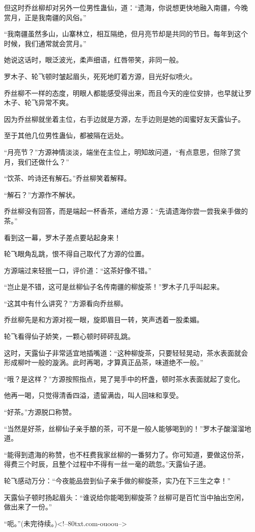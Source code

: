 \begin{this_body}
但这时乔丝柳却对另外一位男性蛊仙，道：“遗海，你说想更快地融入南疆，今晚赏月，正是我南疆的风俗。”

“我南疆虽然多山，山寨林立，相互隔绝，但月亮节却是共同的节日。每年到这个时候，我们通常就会赏月。”

她说这话时，眼泛波光，柔声细语，红唇带笑，非同一般。

罗木子、轮飞顿时皱起眉头，死死地盯着方源，目光好似喷火。

乔丝柳不一样的态度，明眼人都能感受得出来，而且今天的座位安排，也早就让罗木子、轮飞异常不爽。

因为乔丝柳就坐着主位，右手边就是方源，左手边则是她的闺蜜好友天露仙子。

至于其他几位男性蛊仙，都被隔在远处。

“月亮节？”方源神情淡淡，端坐在主位上，明知故问道，“有点意思，但除了赏月，我们还做什么？”

“饮茶、吟诗还有解石。”乔丝柳笑着解释。

“解石？”方源作不解状。

乔丝柳没有回答，而是端起一杯香茶，递给方源：“先请遗海你尝一尝我亲手做的茶。”

看到这一幕，罗木子差点要站起身来！

轮飞眼角乱跳，恨不得自己取代了方源的位置。

方源端过来轻抿一口，评价道：“这茶好像不错。”

“岂止是不错，这可是丝柳仙子名传南疆的柳旋茶！”罗木子几乎叫起来。

“这其中有什么讲究？”方源看向乔丝柳。

乔丝柳先是和方源对视一眼，旋即眉目一转，笑声透着一股柔媚。

轮飞看得仙子娇笑，一颗心顿时砰砰乱跳。

这时，天露仙子非常适宜地插嘴道：“这种柳旋茶，只要轻轻晃动，茶水表面就会形成柳叶一般的漩涡。此时再喝，才算真正品茶，味道绝不一般。”

“哦？是这样？”方源按照指点，晃了晃手中的杯盏，顿时茶水表面就起了变化。

他再一喝，只觉得清香四溢，遗留满齿，叫人回味和享受。

“好茶。”方源脱口称赞。

“当然是好茶，丝柳仙子亲手酿的茶，可不是一般人能够喝到的！”罗木子酸溜溜地道。

“能得到遗海的称赞，也不枉费我家丝柳的一番努力了。你可知道，要做这份茶，得费三个时辰，且整个过程中不得有一丝一毫的疏忽。”天露仙子道。

轮飞感动万分：“今夜能品尝到仙子亲手做的柳旋茶，实乃在下三生之幸！”

天露仙子顿时扬起眉头：“谁说给你能喝到柳旋茶？丝柳可是百忙当中抽出空闲，做出来了一份。”

“呃。”(未完待续。)<!--80txt.com-ouoou-->

\end{this_body}

